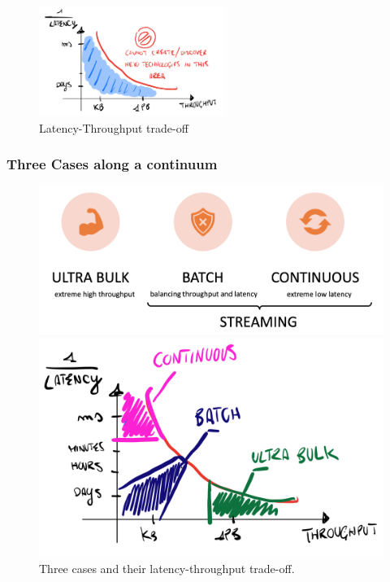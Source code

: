 \documentclass[10pt,a4paper]{article}
\begin{document}
\begin{figure}[ht!]
 \hfill \includegraphics[width=170pt]{images/latency-throughput.png}\hspace*{\fill}
 \caption{Latency-Throughput trade-off}
\end{figure}  

\pagebreak
\subsubsection{Three Cases along a continuum}

 \begin{figure}[ht!]
\centering
\begin{minipage}{.5\textwidth}
  \centering
  \includegraphics[width=.8\linewidth]{images/three-cases-continuum}
\end{minipage}%
\begin{minipage}{.5\textwidth}
  \centering
  \includegraphics[width=.8\linewidth]{images/three-cases}
\end{minipage}
\caption{Three cases and their latency-throughput trade-off.}
\end{figure} 
\end{document}
